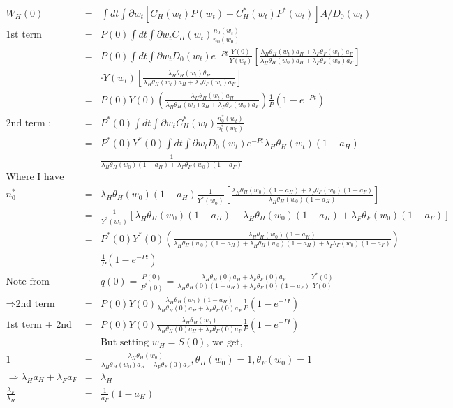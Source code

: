 \documentclass[]{article}
\begin{document}
\begin{eqnarray*}
W_H(0) &=& \int dt \int \partial w_t [C_H(w_t)P(w_t) + C_H^* (w_t) P^*(w_t)] A/D_0(w_t)\\
\mbox{1st term } &=& P(0) \int dt \int \partial w_t C_H(w_t) \frac{n_0(w_t)}{n_0(w_0)}\\
&=& P(0) \int dt \int \partial w_t D_0(w_t) e^{-Pt} \frac{Y(0)}{Y(w_t)} \left[\frac{\lambda_H \theta_H(w_t)a_H + \lambda_F \theta_F(w_t)a_F}{\lambda_H \theta_H(w_0)a_H + \lambda_F \theta_F (w_0) a_F}\right]\\
&& \cdot Y(w_t) \left[\frac{\lambda_H \theta_H(w_t)\theta_H}{\lambda_H \theta_H(w_t)a_H + \lambda_F \theta_F (w_t) a_F }\right]\\
&=& P(0) Y(0) \left(\frac{\lambda_H \theta_H(w_t)a_H}{\lambda_H \theta_H(w_0)a_H + \lambda_F \theta_F (w_0) a_F}\right) \frac{1}{P} (1-e^{-Pt})\\
\mbox{2nd term : } &=& P^*(0) \int dt \int \partial w_t C_H^*(w_t) \frac{n_0^*(w_t)}{n_0^*(w_0)}\\
&=& P^*(0) Y^*(0) \int dt \int \partial w_t D_0(w_t) e^{-Pt} \lambda_H \theta_H(w_t)(1-a_H)\\
&& \frac{1}{\lambda_H \theta_H(w_0)(1-a_H) + \lambda_F \theta_F (w_0) (1-a_F)}\\ 
\mbox{Where I have used,}&&\\
n^*_0 &=& \lambda_H \theta_H(w_0) (1-a_H) \frac{1}{Y^*(w_0)} \left[\frac{\lambda_H \theta_H(w_0)(1-a_H) + \lambda_F \theta_F (w_0) (1-a_F)}{\lambda_H \theta_H(w_0) (1-a_H)}\right]\\
&=& \frac{1}{Y^*(w_0)} [\lambda_H \theta_H(w_0)(1-a_H) + \lambda_H \theta_H (w_0) (1-a_H) + \lambda_F \theta_F(w_0)(1-a_F)]\\
&=& P^*(0) Y^*(0) \left(\frac{\lambda_H \theta_H(w_0)(1-a_H)}{\lambda_H \theta_H(w_0)(1-a_H) + \lambda_H \theta_H (w_0) (1-a_H) + \lambda_F \theta_F(w_0)(1-a_F)}\right)\\
&& \frac{1}{P} (1-e^{-Pt})\\
\mbox{Note from } && q(0) = \frac{P(0)}{P^*(0)} = \frac{\lambda_H \theta_H(0)a_H + \lambda_F \theta_F(0) a_F}{\lambda_H \theta_H(0)(1-a_H) + \lambda_F \theta_F(0) (1-a_F)} \frac{Y^*(0)}{Y(0)}\\
\Rightarrow \mbox{2nd term } &=& P(0) Y(0) \frac{\lambda_H \theta_H(w_0) (1-a_H)}{\lambda_H \theta_H(0)a_H + \lambda_F \theta_F(0) a_F} \frac{1}{P} (1-e^{-Pt})\\
\mbox{1st term + 2nd term } &=& P(0) Y(0) \frac{\lambda_H \theta_H(w_0)}{\lambda_H \theta_H(0) a_H + \lambda_F \theta_F(0) a_F} \frac{1}{P} (1-e^{-Pt})\\
&& \mbox{But setting $w_H = S(0)$, we get,}\\
1&=& \frac{\lambda_H \theta_H(w_0)}{\lambda_H \theta_H(w_0)a_H + \lambda_F \theta_F(0)a_F}, \theta_H(w_0) = 1, \theta_F(w_0) = 1\\
\Rightarrow \lambda_H a_H + \lambda_F a_F &=& \lambda_H\\
\frac{\lambda_F}{\lambda_H} &=& \frac{1}{a_F} (1-a_H)
\end{eqnarray*}
\end{document}
